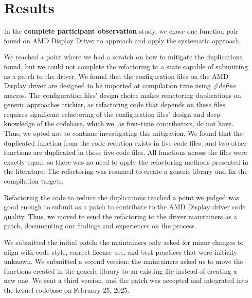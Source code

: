 \documentclass[10pt,conference]{IEEEtran}
\begin{document}
\section{Results}

In the \textbf{complete participant observation} study, we chose one function pair found on AMD Display Driver to approach and apply the systematic approach.


We reached a point where we had a scratch on how to mitigate the duplications found, but we could not complete the refactoring to a state capable of submitting as a patch to the driver. We found that the configuration files on the AMD Display driver are designed to be imported at compilation time using \textit{\#define} macros. The configuration files' design choice makes refactoring duplications on generic approaches trickier, as refactoring code that depends on these files requires significant refactoring of the configuration files' design and deep knowledge of the codebase, which we, as first-time contributors, do not have. Thus, we opted not to continue investigating this mitigation.
We found that the duplicated function from the code redution exists in five code files, 
and two other functions are duplicated in those five code files. All functions across the files were exactly equal, 
so there was no need to apply the refactoring methods presented in the literature. 
The refactoring was resumed to create a generic library and fix the compilation targets.

Refactoring the code to reduce the duplications reached a point we judged was good enough to submit as a 
patch to contribute to the AMD Display driver code quality. Thus, we moved to send 
the refactoring to the driver maintainers as a patch, documenting our findings and experiences 
on the process.

We submitted the initial patch: the maintainers only asked for minor changes to align with code style, correct license use, and best practices that were initially unknown. We submitted a second version: the maintainers asked us to move the functions created in the generic library to an existing file instead of creating a new one. We sent a third version, and the patch was accepted and integrated into the kernel codebase on February 25, 2025.
\end{document}
